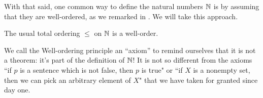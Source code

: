 \documentclass[../notes.tex]{subfiles}
\begin{document}
With that said, one common way to define the natural numbers $\mathbb N$ is by assuming that they are well-ordered, as we remarked in . We will take this approach.
\begin{axiom}  \label{ax:wop}
    The usual total ordering $\le$ on $\mathbb N$ is a well-order.
\end{axiom}
We call the Well-ordering principle an ``axiom'' to remind ourselves that it is not a theorem: it's part of the definition of $\mathbb N$!
It is not so different from the axioms ``if $p$ is a sentence which is not false, then $p$ is true" or ``if $X$ is a nonempty set, then we can pick an arbitrary element of $X$" that we have taken for granted since day one.
\end{document}
